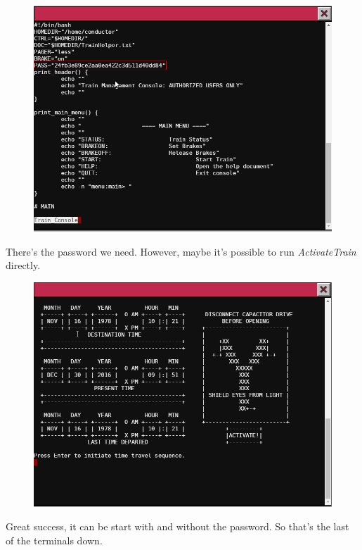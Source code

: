 \documentclass[writeup.tex]{subfiles}
\begin{document}
			\begin{figure}[H]
				\centering
				\includegraphics[width=\linewidth]{"screenshots/terminals/Terminal 5 - less Train_Console"}
			\end{figure}
			
			There's the password we need. However, maybe it's possible to run \textit{ActivateTrain} directly.
			
			\begin{figure}[H]
				\centering
				\includegraphics[width=\linewidth]{"screenshots/terminals/Terminal 5 - time travel"}
			\end{figure}
			
			Great success, it can be start with and without the password. So that's the last of the terminals down.
			
		
\end{document}
